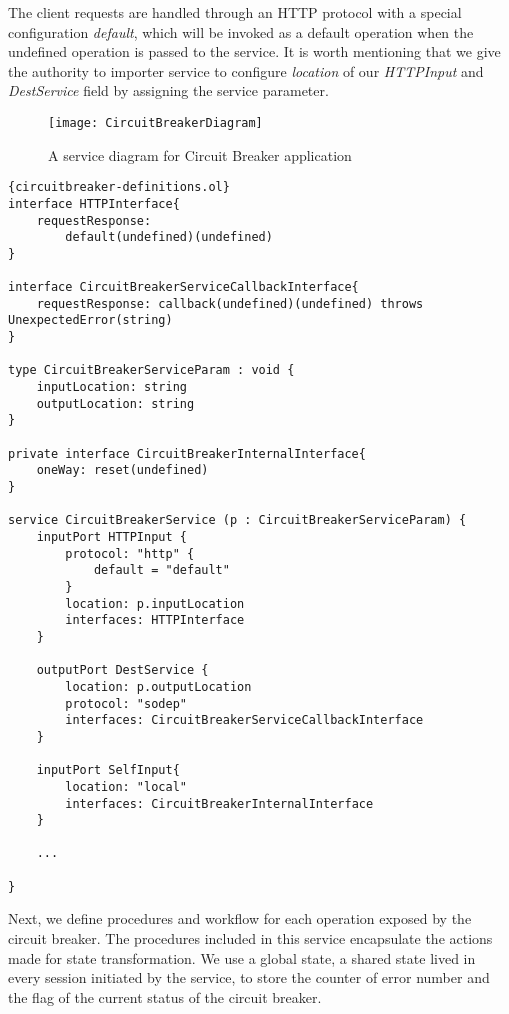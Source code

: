 The client requests are handled through an HTTP protocol with a special configuration \textit{default}, which will be invoked as a default operation when the undefined operation is passed to the service. It is worth mentioning that we give the authority to importer service to configure \textit{location} of our \textit{HTTPInput} and \textit{DestService} field by assigning the service parameter.


\begin{figure}[ht]
    \texttt{[image: CircuitBreakerDiagram]}
    \centering
    \caption{A service diagram for Circuit Breaker application}
    \label{list:circuit-breaker-skel-application}
\end{figure}

\begin{listing}[H]
    \lstset{language=Jolie,
        style=codeStyle,
        numbers=left,
        firstnumber=1
    }
    \begin{lstlisting}[frame=tlrb,
basicstyle=\footnotesize]{circuitbreaker-definitions.ol}
interface HTTPInterface{
    requestResponse:
        default(undefined)(undefined)
}

interface CircuitBreakerServiceCallbackInterface{
    requestResponse: callback(undefined)(undefined) throws UnexpectedError(string)
}

type CircuitBreakerServiceParam : void {
    inputLocation: string
    outputLocation: string
}

private interface CircuitBreakerInternalInterface{
    oneWay: reset(undefined)
}

service CircuitBreakerService (p : CircuitBreakerServiceParam) { 
    inputPort HTTPInput {
        protocol: "http" {
            default = "default"
        }
        location: p.inputLocation
        interfaces: HTTPInterface
    }

    outputPort DestService {
        location: p.outputLocation
        protocol: "sodep"
        interfaces: CircuitBreakerServiceCallbackInterface
    }

    inputPort SelfInput{
        location: "local"
        interfaces: CircuitBreakerInternalInterface
    }

    ...

}

\end{lstlisting}
\end{listing}

Next, we define procedures and workflow for each operation exposed by the circuit breaker. The procedures included in this service encapsulate the actions made for state transformation. We use a global state, a shared state lived in every session initiated by the service, to store the counter of error number and the flag of the current status of the circuit breaker.

